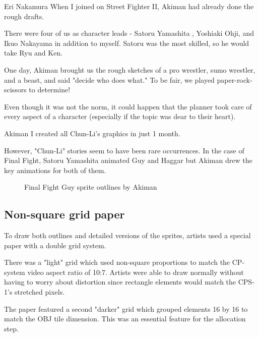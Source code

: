 \begin{q}{Eri Nakamura\cite{sf2devinterview}}
When I joined on Street Fighter II, Akiman had already done the rough drafts. 

There were four of us as character leads - Satoru Yamashita , Yoshiaki Ohji, and Ikuo Nakayama in addition to myself. Satoru was the most skilled, so he would take Ryu and Ken. 

One day, Akiman brought us the rough sketches of a pro wrestler, sumo wrestler, and a beast, and said "decide who does what." To be fair, we played paper-rock-scissors to determine!
\end{q}



Even though it was not the norm, it could happen that the planner took care of every aspect of a character (especially if the topic was dear to their heart).

\begin{q}{Akiman\cite{gameMaestro4}}
I created all Chun-Li’s graphics in just 1 month.
\end{q}

However, "Chun-Li" stories seem to have been rare occurrences.   In the case of Final Fight, Satoru Yamashita animated Guy and Haggar but Akiman drew the key animations for both of them.



\begin{figure}[H]
\caption*{Final Fight Guy sprite outlines by Akiman}
\end{figure}




\subsection{Non-square grid paper}\label{artists_par}
To draw both outlines and detailed versions of the sprites, artists used a special paper with a double grid system.

There was a "light" grid which used non-square proportions to match the CP-system video aspect ratio of 10:7. Artists were able to draw normally without having to worry about distortion since rectangle elements would match the CPS-1's stretched pixels. 

The paper featured a second "darker" grid which grouped elements 16 by 16 to match the OBJ tile dimension. This was an essential feature for the allocation step.






